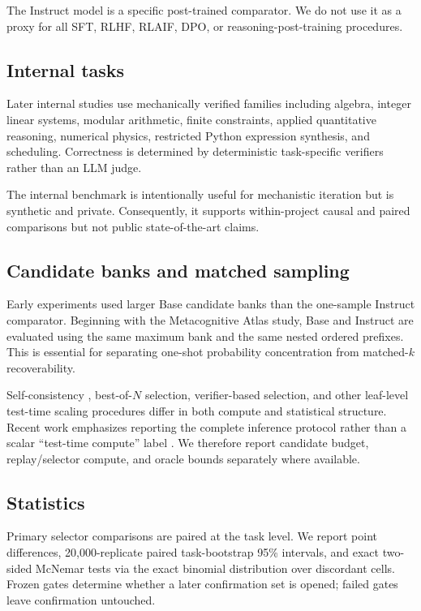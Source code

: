 \documentclass[11pt]{article}
\begin{document}
The Instruct model is a specific post-trained comparator. We do not use it as a proxy for all SFT, RLHF, RLAIF, DPO, or reasoning-post-training procedures.

\subsection{Internal tasks}

Later internal studies use mechanically verified families including algebra, integer linear systems, modular arithmetic, finite constraints, applied quantitative reasoning, numerical physics, restricted Python expression synthesis, and scheduling. Correctness is determined by deterministic task-specific verifiers rather than an LLM judge.

The internal benchmark is intentionally useful for mechanistic iteration but is synthetic and private. Consequently, it supports within-project causal and paired comparisons but not public state-of-the-art claims.

\subsection{Candidate banks and matched sampling}

Early experiments used larger Base candidate banks than the one-sample Instruct comparator. Beginning with the Metacognitive Atlas study, Base and Instruct are evaluated using the same maximum bank and the same nested ordered prefixes. This is essential for separating one-shot probability concentration from matched-$k$ recoverability.

Self-consistency \cite{wang2022selfconsistency}, best-of-$N$ selection, verifier-based selection, and other leaf-level test-time scaling procedures differ in both compute and statistical structure. Recent work emphasizes reporting the complete inference protocol rather than a scalar ``test-time compute'' label \cite{hariri2026tts}. We therefore report candidate budget, replay/selector compute, and oracle bounds separately where available.

\subsection{Statistics}

Primary selector comparisons are paired at the task level. We report point differences, 20,000-replicate paired task-bootstrap 95\% intervals, and exact two-sided McNemar tests via the exact binomial distribution over discordant cells. Frozen gates determine whether a later confirmation set is opened; failed gates leave confirmation untouched.
\end{document}
